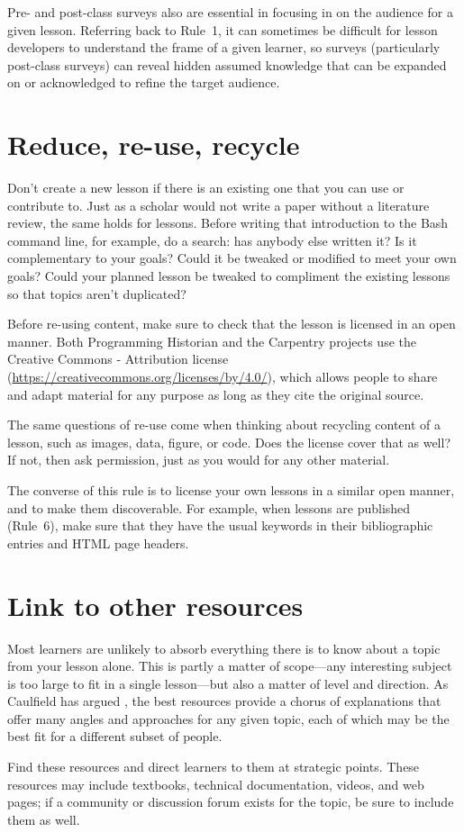 \documentclass[10pt,letterpaper]{article}
\newcommand{\rulemajor}[1]{\section{#1}}
\begin{document}
Pre- and post-class surveys also are essential in focusing in on the audience for a given lesson.
Referring back to Rule~1,
it can sometimes be difficult for lesson developers to understand the frame of a given learner,
so surveys (particularly post-class surveys) can reveal hidden assumed knowledge
that can be expanded on or acknowledged to refine the target audience.

\rulemajor{Reduce, re-use, recycle}

Don't create a new lesson if there is an existing one that you can use or contribute to.
Just as a scholar would not write a paper without a literature review,
the same holds for lessons.
Before writing that introduction to the Bash command line,
for example,
do a search:
has anybody else written it?
Is it complementary to your goals?
Could it be tweaked or modified to meet your own goals?
Could your planned lesson be tweaked to compliment the existing lessons so that topics aren't duplicated?

Before re-using content,
make sure to check that the lesson is licensed in an open manner.
Both Programming Historian and the Carpentry projects
use the Creative Commons - Attribution license
(\url{https://creativecommons.org/licenses/by/4.0/}),
which allows people to share and adapt material for any purpose
as long as they cite the original source.

The same questions of re-use come when thinking about recycling content of a lesson,
such as images, data, figure, or code.
Does the license cover that as well?
If not,
then ask permission,
just as you would for any other material.

The converse of this rule is to license your own lessons in a similar open manner,
and to make them discoverable.
For example,
when lessons are published (Rule~6),
make sure that they have the usual keywords in their bibliographic entries
and HTML page headers.

\rulemajor{Link to other resources}

Most learners are unlikely to absorb everything there is to know about a topic
from your lesson alone.
This is partly a matter of scope---any interesting subject is too large
to fit in a single lesson---but also a matter of level and direction.
As Caulfield has argued \cite{choral-explanations},
the best resources provide a chorus of explanations
that offer many angles and approaches for any given topic,
each of which may be the best fit for a different subset of people.

Find these resources and direct learners to them at strategic points.
These resources may include textbooks,
technical documentation,
videos,
and web pages;
if a community or discussion forum exists for the topic,
be sure to include them as well.
\end{document}
